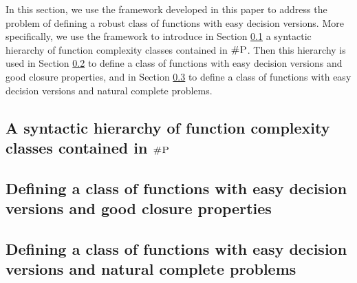 In this section, we use the framework developed in this paper to address the problem of defining a robust class of functions with easy decision versions. More specifically, we use the framework to introduce in Section \ref{sec-hier-shp} a syntactic hierarchy of function complexity classes contained in $\text{\sc \#P}$. Then this hierarchy is used in Section \ref{sec-clo} to define a class of functions with easy decision versions and good closure properties, and in Section \ref{sec-horn} to define a class of functions with easy decision versions and 
natural complete problems.





%
%
%
%
%

\subsection{A syntactic hierarchy of function complexity classes contained in $\text{\sc \#P}$}
\label{sec-hier-shp}


\subsection{Defining a class of functions with easy decision versions and good closure properties}
\label{sec-clo}


\subsection{Defining a class of functions with easy decision versions and natural complete problems}
\label{sec-horn}




